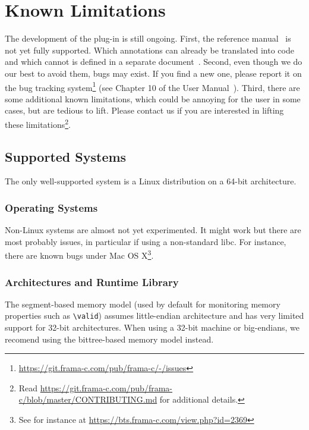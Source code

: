 \chapter{Known Limitations}

The development of the \eacsl plug-in is still ongoing. First, the \eacsl
reference manual~\cite{eacsl} is not yet fully supported. Which annotations can
already be translated into \C code and which cannot is defined in a separate
document~\cite{eacsl-implem}. Second, even though we do our best to avoid them,
bugs may exist. If you find a new one, please report it on the bug tracking
system\footnote{\url{https://git.frama-c.com/pub/frama-c/-/issues}} (see Chapter
10 of the \framac User Manual~\cite{userman}). Third, there are some additional
known limitations, which could be annoying for the user in some cases, but are
tedious to lift. Please contact us if you are interested in lifting these
limitations\footnote{Read
  \url{https://git.frama-c.com/pub/frama-c/blob/master/CONTRIBUTING.md} for
  additional details.}.

\section{Supported Systems}

\begin{important}
The only well-supported system is a Linux distribution on a 64-bit architecture.
\end{important}

\subsection{Operating Systems}

Non-Linux systems are almost not yet experimented. It might work but there are
most probably issues, in particular if using a non-standard
libc. For instance, there are known bugs under Mac OS
X\footnote{See for instance at
  \url{https://bts.frama-c.com/view.php?id=2369}}.

\subsection{Architectures and Runtime Library}

The segment-based memory model (used by default for monitoring memory properties
such as \lstinline|\valid|) assumes little-endian architecture and has very
limited support for 32-bit architectures. When using a 32-bit machine or
big-endians, we recomend using the bittree-based memory model instead.

